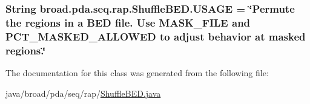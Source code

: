 \hypertarget{classbroad_1_1pda_1_1seq_1_1rap_1_1_shuffle_b_e_d_a4cd614ee2fc3feb74d8a3edbea8bb987}{
\subsubsection[{U\+S\+A\+G\+E}]{\setlength{\rightskip}{0pt plus 5cm}String broad.\+pda.\+seq.\+rap.\+Shuffle\+B\+E\+D.\+U\+S\+A\+G\+E = \char`\"{}Permute the regions in a B\+E\+D file. Use {\bf M\+A\+S\+K\+\_\+\+F\+I\+L\+E} and {\bf P\+C\+T\+\_\+\+M\+A\+S\+K\+E\+D\+\_\+\+A\+L\+L\+O\+W\+E\+D} to adjust behavior at masked regions.\char`\"{}}}\label{classbroad_1_1pda_1_1seq_1_1rap_1_1_shuffle_b_e_d_a4cd614ee2fc3feb74d8a3edbea8bb987}


The documentation for this class was generated from the following file\+:\begin{DoxyCompactItemize}
\item 
java/broad/pda/seq/rap/\hyperlink{_shuffle_b_e_d_8java}{Shuffle\+B\+E\+D.\+java}\end{DoxyCompactItemize}
